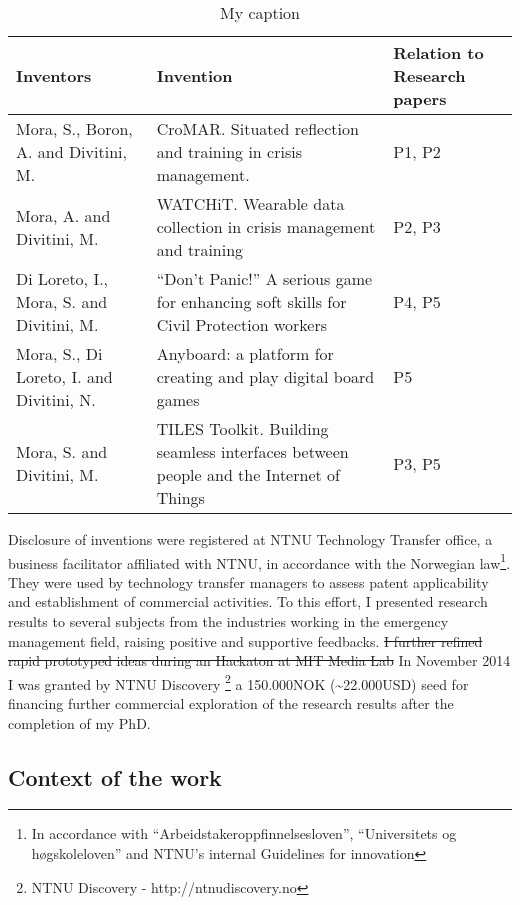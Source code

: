 \begin{table}[h]
\begin{tabular}{p{}p{}p{}}
\toprule
Inventors                              & Invention  & Relation to Research papers  \\ \midrule
Mora, S., Boron, A. and Divitini, M.   & CroMAR. Situated reflection and training in crisis management.   & P1, P2    \\
Mora, A. and Divitini, M. & WATCHiT. Wearable data collection in crisis management and training & P2, P3 \\
Di Loreto, I., Mora, S. and Divitini, M. & “Don’t Panic!” A serious game for enhancing soft skills for Civil Protection workers & P4, P5 \\
Mora, S., Di Loreto, I. and Divitini, N. & Anyboard: a platform for creating and play digital board games & P5 \\
Mora, S. and Divitini, M. & TILES Toolkit. Building seamless interfaces between people and the Internet of Things & P3, P5 \\
\bottomrule
\end{tabular}
\caption{My caption}
\label{my-label}
\end{table}

Disclosure of inventions were registered at NTNU Technology Transfer
office, a business facilitator affiliated with NTNU, in accordance with
the Norwegian law\footnote{In accordance with
  ``Arbeidstakeroppfinnelsesloven'', ``Universitets og høgskoleloven''
  and NTNU's internal Guidelines for innovation}. They were used by
technology transfer managers to assess patent applicability and
establishment of commercial activities. To this effort, I presented
research results to several subjects from the industries working in the
emergency management field, raising positive and supportive feedbacks.
\sout{I further refined rapid prototyped ideas during an Hackaton at MIT
Media Lab} In November 2014 I was granted by NTNU Discovery \footnote{NTNU
  Discovery - http://ntnudiscovery.no} a 150.000NOK
(\textasciitilde{}22.000USD) seed for financing further commercial
exploration of the research results after the completion of my PhD.

\subsection{Context of the work}\label{context-of-the-work}

